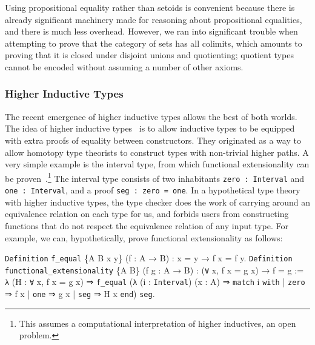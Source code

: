 \documentclass[runningheads]{llncs}
\makeatletter
\gdef\@makeopenbrace<\catcode`{>
\gdef\@makeclosebrace<\catcode`}>
\newcommand{\processcommands}[1]{{%
  \catcode`\\=0\relax
  \@makeopenbrace=1\relax
  \@makeclosebrace=2\relax
  \def\{{\texttt{\mytextbraceleft}}
  \def\}{\texttt{\mytextbraceright}}
  \scantokens{#1}%
}}
\newcommand{\processcommandsinverbatimline}{\expandafter\processcommands\expandafter{\the\verbatim@line}}
\newenvironment{coqcode}{\begingroup
  \vspace{0.5\baselineskip}
  \let\trivlist\relax
  \let\endtrivlist\relax
  \let\item\relax
  \setlength{\parsep}{0pt}%
  \setlength{\parskip}{0pt}%
  \setlength{\topsep}{0pt}%
  \setlength{\@topsepadd}{0pt}%
  \setlength{\partopsep}{0pt}%
  \setlength{\@topsep}{0pt}%
  \let\old@@par\@@par
  \let\@@par\relax
  \let\old@vskip\vskip
  \let\vskip\relax
  \verbatim
  \let\@@par\old@@par
  \let\vskip\old@vskip
  \let\verbatim@processline=\processcommandsinverbatimline
}{\endverbatim\endgroup\vspace{0.5\baselineskip}}
\newcommand{\colortext}[2]{\textcolor{#1}{#2}}
\newcommand{\coqdockw}[1]{\texttt {\colortext{kwred}{#1}}}
\newcommand{\coqdocvar}[1]{\colortext{varpurple}{#1}}
\newcommand{\coqdoccst}[1]{\texttt{\colortext{defgreen}{#1}}}%
\newcommand{\coqdocind}[1]{\texttt{\colortext{indblue}{#1}}}%
\newcommand{\coqdocconstr}[1]{\texttt {\colortext{constrmaroon}{#1}}}
\newcommand{\coqdocdefinition}[1]{\coqdoccst{#1}}
\newcommand{\coqdocvariable}[1]{\coqdocvar{#1}}
\newcommand{\coqdocconstructor}[1]{\coqdocconstr{#1}}
\makeatother
\begin{document}
      Using propositional equality rather than setoids is convenient because there is already significant machinery made for reasoning about propositional equalities, and there is much less overhead.  However, we ran into significant trouble when attempting to prove that the category of sets has all colimits, which amounts to proving that it is closed under disjoint unions and quotienting; quotient types cannot be encoded without assuming a number of other axioms.


    \subsubsection{Higher Inductive Types}\label{sec:hit}
      The recent emergence of higher inductive types allows the best of both worlds.  The idea of higher inductive types~\cite{HoTTBook} is to allow inductive types to be equipped with extra proofs of equality between constructors. They originated as a way to allow homotopy type theorists to construct types with non-trivial higher paths.  A very simple example is the interval type, from which functional extensionality can be proven~\cite{interval-implies-funext}.\footnote{This assumes a computational interpretation of higher inductives, an open problem.}  The interval type consists of two inhabitants \texttt{zero}~\texttt{:}~\texttt{Interval} and \texttt{one}~\texttt{:}~\texttt{Interval}, and a proof \texttt{seg~:~zero~=~one}.  In a hypothetical type theory with higher inductive types, the type checker does the work of carrying around an equivalence relation on each type for us, and forbids users from constructing functions that do not respect the equivalence relation of any input type.  For example, we can, hypothetically, prove functional extensionality as follows:
\begin{coqcode}
\coqdockw{Definition} \coqdocdefinition{f_equal} \{\coqdocvariable{A B x y}\} (\coqdocvariable{f} : \coqdocvariable{A} → \coqdocvariable{B}) : \coqdocvariable{x} = \coqdocvariable{y} → \coqdocvariable{f x} = \coqdocvariable{f y}.
\coqdockw{Definition} \coqdocdefinition{functional_extensionality} \{\coqdocvariable{A B}\} (\coqdocvariable{f g} : \coqdocvariable{A} → \coqdocvariable{B})
    : (\coqdockw{∀} \coqdocvariable{x}, \coqdocvariable{f x} = \coqdocvariable{g x}) → \coqdocvariable{f} = \coqdocvariable{g}
  := \coqdockw{λ} (\coqdocvariable{H} : \coqdockw{∀} \coqdocvariable{x}, \coqdocvariable{f x} = \coqdocvariable{g x})
       ⇒ \coqdocdefinition{f_equal} (\coqdockw{λ} (\coqdocvariable{i} : \coqdocind{Interval}) (\coqdocvariable{x} : \coqdocvariable{A})
                     ⇒ \coqdockw{match} \coqdocvariable{i} \coqdockw{with}
                         | \coqdocconstructor{zero} ⇒ \coqdocvariable{f x}
                         | \coqdocconstructor{one}  ⇒ \coqdocvariable{g x}
                         | \coqdocconstructor{seg}  ⇒ \coqdocvariable{H x}
                       \coqdockw{end})
                  \coqdocconstructor{seg}.
\end{coqcode}
\end{document}
